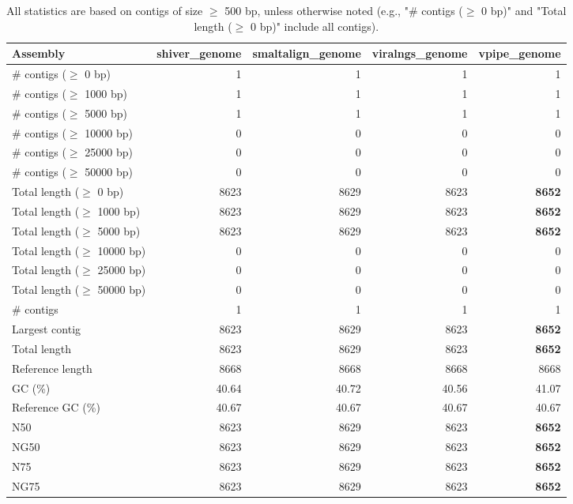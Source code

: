 \documentclass[12pt,a4paper]{article}
\begin{document}
\begin{table}[ht]
\begin{center}
\caption{All statistics are based on contigs of size $\geq$ 500 bp, unless otherwise noted (e.g., "\# contigs ($\geq$ 0 bp)" and "Total length ($\geq$ 0 bp)" include all contigs).}
\begin{tabular}{|l*{4}{|r}|}
\hline
Assembly & shiver\_genome & smaltalign\_genome & viralngs\_genome & vpipe\_genome \\ \hline
\# contigs ($\geq$ 0 bp) & 1 & 1 & 1 & 1 \\ \hline
\# contigs ($\geq$ 1000 bp) & 1 & 1 & 1 & 1 \\ \hline
\# contigs ($\geq$ 5000 bp) & 1 & 1 & 1 & 1 \\ \hline
\# contigs ($\geq$ 10000 bp) & 0 & 0 & 0 & 0 \\ \hline
\# contigs ($\geq$ 25000 bp) & 0 & 0 & 0 & 0 \\ \hline
\# contigs ($\geq$ 50000 bp) & 0 & 0 & 0 & 0 \\ \hline
Total length ($\geq$ 0 bp) & 8623 & 8629 & 8623 & {\bf 8652} \\ \hline
Total length ($\geq$ 1000 bp) & 8623 & 8629 & 8623 & {\bf 8652} \\ \hline
Total length ($\geq$ 5000 bp) & 8623 & 8629 & 8623 & {\bf 8652} \\ \hline
Total length ($\geq$ 10000 bp) & 0 & 0 & 0 & 0 \\ \hline
Total length ($\geq$ 25000 bp) & 0 & 0 & 0 & 0 \\ \hline
Total length ($\geq$ 50000 bp) & 0 & 0 & 0 & 0 \\ \hline
\# contigs & 1 & 1 & 1 & 1 \\ \hline
Largest contig & 8623 & 8629 & 8623 & {\bf 8652} \\ \hline
Total length & 8623 & 8629 & 8623 & {\bf 8652} \\ \hline
Reference length & 8668 & 8668 & 8668 & 8668 \\ \hline
GC (\%) & 40.64 & 40.72 & 40.56 & 41.07 \\ \hline
Reference GC (\%) & 40.67 & 40.67 & 40.67 & 40.67 \\ \hline
N50 & 8623 & 8629 & 8623 & {\bf 8652} \\ \hline
NG50 & 8623 & 8629 & 8623 & {\bf 8652} \\ \hline
N75 & 8623 & 8629 & 8623 & {\bf 8652} \\ \hline
NG75 & 8623 & 8629 & 8623 & {\bf 8652} \\ \hline

\end{tabular}
\end{center}
\end{table}
\end{document}
